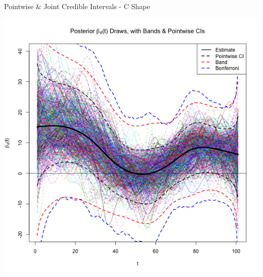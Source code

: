 \documentclass[9 pt]{beamer}
\begin{document}
\begin{frame}{Pointwise \& Joint Credible Intervals - C Shape}

\begin{center}

\includegraphics[scale=.37]{pics/Figure_Bands_C_Shape_12-19-12_bonf.png}

\end{center}
\end{frame}
\end{document}
